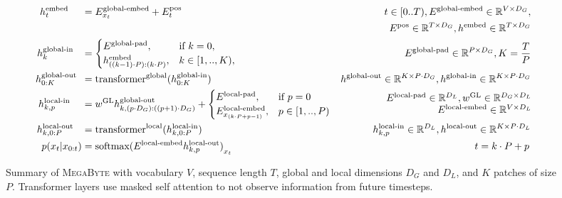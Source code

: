 \documentclass{article}
\newcommand{\fastslow}[0]{\textsc{MegaByte}\xspace}
\newcommand{\megabyte}[0]{\fastslow}
\newcommand{\h}[1]{h^\text{#1}}%
\newcommand{\inR}[1]{\in\mathbb{R}^{#1}}
\newcommand{\transformer}[2]{\text{transformer}^{\text{#1}}(#2)}
\theoremstyle{plain}
\theoremstyle{definition}
\theoremstyle{remark}
\begin{document}
\begin{figure}[t]
\begin{minipage}{0.7\linewidth}
\begin{align*}
\h{embed}_{t}\,\,\,\,\,\,\,\,&= E^\text{global-embed}_{x_t}+E^\text{pos}_t  & t\in [0..T), E^{\text{global-embed}}\inR{V\times D_G},\\& &E^{\text{pos}}\inR{T\times D_G}, \h{embed}\inR{T\times D_G}  \\
\h{global-in}_{k} \,\,\,\,\,&= 
\begin{cases}
E^{\text{global-pad}}, & \text{if } k = 0, \\
\h{embed}_{((k-1)\cdot P):(k \cdot P)}, & k\in [1,..,K),  \\
\end{cases}  & E^{\text{global-pad}}\inR{P\times D_G}, K=\frac{T}{P}
\\
\h{global-out}_{0:K} \,\,\,&= \transformer{global}{\h{global-in}_{0:K}}  & \h{global-out}\inR{K\times P\cdot D_G},\h{global-in}\inR{K\times P\cdot D_G}\\
\h{local-in}_{k,p} \,\,\,\,\,\,\,&= w^{\text{GL}}\h{global-out}_{k,(p\cdot D_G):((p+1)\cdot D_G)} + 
\begin{cases}
E^\text{local-pad}, & \text{if } p=0   \\
E^\text{local-embed}_{x_{(k\cdot P + p - 1)}}, & p\in [1,..,P)   \\
\end{cases} &  
\begin{array}{r}
E^{\text{local-pad}}\inR{D_L} , w^{\text{GL}}\inR{D_G\times D_L}\\ E^{\text{local-embed}}\inR{V\times D_L}
\end{array}\hspace{-2mm}
\\
\h{local-out}_{k,0:P} \,\,\,\,\,&= \transformer{local}{\h{local-in}_{k,0:P}}  & \h{local-in}_{k,p}\inR{D_L}, \h{local-out}\inR{K\times P\cdot D_L} \\
p(x_{t}|x_{0:t}) &= \text{softmax}{(E^\text{local-embed}\h{local-out}_{k,p})}_{x_t}  & t=k\cdot P+p\,
\end{align*}
\end{minipage}
\caption{Summary of \megabyte with vocabulary $V$, sequence length $T$, global and local dimensions $D_G$ and $D_L$, and $K$ patches of size $P$. Transformer layers use masked self attention to not observe information from future timesteps. 
}
\end{figure}
\end{document}
